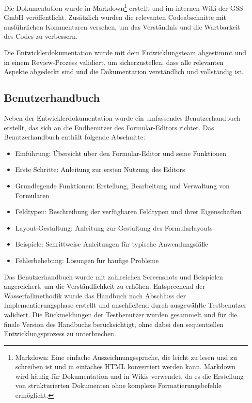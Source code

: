 \documentclass[a4paper,11pt]{article}
\begin{document}
\noindent Die Dokumentation wurde in Markdown\footnote{Markdown: Eine einfache Auszeichnungssprache, die leicht zu lesen und zu schreiben ist und in einfaches HTML konvertiert werden kann. Markdown wird häufig für Dokumentation und in Wikis verwendet, da es die Erstellung von strukturierten Dokumenten ohne komplexe Formatierungsbefehle ermöglicht.} erstellt und im internen Wiki der GSS-GmbH veröffentlicht. Zusätzlich wurden die relevanten Codeabschnitte mit ausführlichen Kommentaren versehen, um das Verständnis und die Wartbarkeit des Codes zu verbessern.

\noindent Die Entwicklerdokumentation wurde mit dem Entwicklungsteam abgestimmt und in einem Review-Prozess validiert, um sicherzustellen, dass alle relevanten Aspekte abgedeckt sind und die Dokumentation verständlich und vollständig ist.

\subsection{Benutzerhandbuch}
Neben der Entwicklerdokumentation wurde ein umfassendes Benutzerhandbuch erstellt, das sich an die Endbenutzer des Formular-Editors richtet. Das Benutzerhandbuch enthält folgende Abschnitte:

\begin{itemize}
  \item Einführung: Übersicht über den Formular-Editor und seine Funktionen
  \item Erste Schritte: Anleitung zur ersten Nutzung des Editors
  \item Grundlegende Funktionen: Erstellung, Bearbeitung und Verwaltung von Formularen
  \item Feldtypen: Beschreibung der verfügbaren Feldtypen und ihrer Eigenschaften
  \item Layout-Gestaltung: Anleitung zur Gestaltung des Formularlayouts
  \item Beispiele: Schrittweise Anleitungen für typische Anwendungsfälle
  \item Fehlerbehebung: Lösungen für häufige Probleme
\end{itemize}

\noindent Das Benutzerhandbuch wurde mit zahlreichen Screenshots und Beispielen angereichert, um die Verständlichkeit zu erhöhen. Entsprechend der Wasserfallmethodik wurde das Handbuch nach Abschluss der Implementierungsphase erstellt und anschließend durch ausgewählte Testbenutzer validiert. Die Rückmeldungen der Testbenutzer wurden gesammelt und für die finale Version des Handbuchs berücksichtigt, ohne dabei den sequentiellen Entwicklungsprozess zu unterbrechen.
\end{document}
